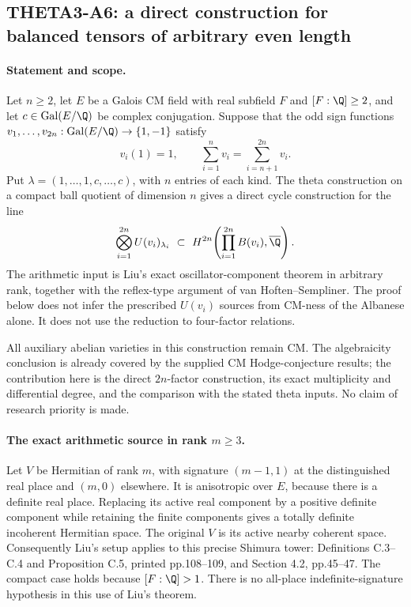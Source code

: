 
\subsection{THETA3-A6: a direct construction for balanced tensors of arbitrary even length}\label{A6}

\paragraph{Statement and scope.}
Let $n\geq2$, let $E$ be a Galois CM field with real subfield $F$
and $[F:\Q]\geq2$, and let $c\in\operatorname{Gal}(E/\Q)$ be complex
conjugation. Suppose that the odd sign functions
$v_1,\ldots,v_{2n}:\operatorname{Gal}(E/\Q)\to\{1,-1\}$ satisfy
\begin{equation}\label{A6-balance}
 v_i(1)=1,\qquad \sum_{i=1}^n v_i=\sum_{i=n+1}^{2n}v_i.
\end{equation}
Put $\lambda=(1,\ldots,1,c,\ldots,c)$, with $n$ entries of each kind.
The theta construction on a compact ball quotient of dimension $n$
gives a direct cycle construction for the line
\begin{equation}\label{A6-line}
 \bigotimes_{i=1}^{2n}U(v_i)_{\lambda_i}
 \ \subset\ H^{2n}\!\left(\prod_{i=1}^{2n}B(v_i),\overline\Q\right).
\end{equation}
The arithmetic input is Liu's exact oscillator-component theorem in
arbitrary rank, together with the reflex-type argument of
van Hoften--Sempliner. The proof below does not infer the prescribed
$U(v_i)$ sources from CM-ness of the Albanese alone. It does not use
the reduction to four-factor relations.

All auxiliary abelian varieties in this construction remain CM. The algebraicity
conclusion is already covered by the supplied CM Hodge-conjecture
results; the contribution here is the direct $2n$-factor construction,
its exact multiplicity and differential degree, and the comparison
with the stated theta inputs. No claim of research priority is made.

\paragraph{The exact arithmetic source in rank $m\geq3$.}
Let $V$ be Hermitian of rank $m$, with signature $(m-1,1)$ at the
distinguished real place and $(m,0)$ elsewhere. It is anisotropic
over $E$, because there is a definite real place. Replacing its active
real component by a positive definite component while retaining the
finite components gives a totally definite incoherent Hermitian
space. The original $V$ is its active nearby coherent space.
Consequently Liu's setup applies to this precise Shimura tower:
Definitions C.3--C.4 and Proposition C.5, printed pp.108--109, and
Section 4.2, pp.45--47. The compact case holds because $[F:\Q]>1$.
There is no all-place indefinite-signature hypothesis in this use
of Liu's theorem.

